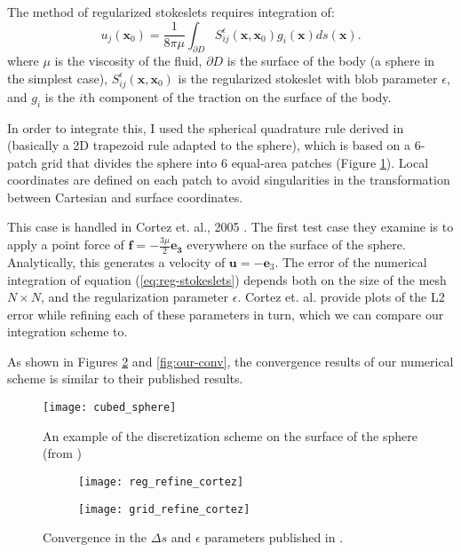 \documentclass{article}
\begin{document}
The method of regularized stokeslets requires integration of:
\begin{equation}
  \label{eq:reg-stokeslets}
  u_j(\mathbf{x}_0) = \frac{1}{8\pi \mu} \int_{\partial D}
  S_{ij}^\epsilon (\mathbf{x}, \mathbf{x}_0) g_i(\mathbf{x}) ds(\mathbf{x}).
\end{equation}
where $\mu$ is the viscosity of the fluid, $\partial D$ is the surface
of the body (a sphere in the simplest case), $S_{ij}^\epsilon
(\mathbf{x}, \mathbf{x}_0)$ is the regularized stokeslet with blob
parameter $\epsilon$, and $g_i$ is the $i$th component of the traction
on the surface of the body.

In order to integrate this, I used the spherical quadrature rule
derived in \cite{Portelenelle2018} (basically a 2D trapezoid rule
adapted to the sphere), which is based on a 6-patch grid that divides
the sphere into 6 equal-area patches (Figure
\ref{fig:discretization}). Local coordinates are defined on each patch
to avoid singularities in the transformation between Cartesian and
surface coordinates. 

This case is handled in Cortez et. al., 2005 \cite{Cortez2005}. The
first test case they examine is to apply a point force of $\mathbf{f}
= -\frac{3\mu}{2} \mathbf{e_3}$ everywhere on the surface of the
sphere. Analytically, this generates a velocity of $\mathbf{u} =
-\mathbf{e}_3$. The error of the numerical integration of equation
(\ref{eq:reg-stokeslets}) depends both on the size of the mesh $N
\times N$, and the regularization parameter $\epsilon$. Cortez
et. al. provide plots of the L2 error while refining each of these
parameters in turn, which we can compare our integration scheme to.

As shown in Figures \ref{fig:cortez-conv} and \ref{fig:our-conv}, the
convergence results of our numerical scheme is similar to their
published results.

\begin{figure}
  \centering
  \texttt{[image: cubed\_sphere]}
  \caption{An example of the discretization scheme on the surface of
    the sphere (from \cite{Portelenelle2018})}
  \label{fig:discretization}
\end{figure}

\begin{figure}
  \centering
  \begin{subfigure}{0.6\textwidth}
    \texttt{[image: reg\_refine\_cortez]}
  \end{subfigure}
  \hfill
  \begin{subfigure}{0.35\textwidth}
    \texttt{[image: grid\_refine\_cortez]}
  \end{subfigure}
  \caption{Convergence in the $\Delta s$ and $\epsilon$ parameters
    published in \cite{Cortez2005}.}
  \label{fig:cortez-conv}
\end{figure}
\end{document}
